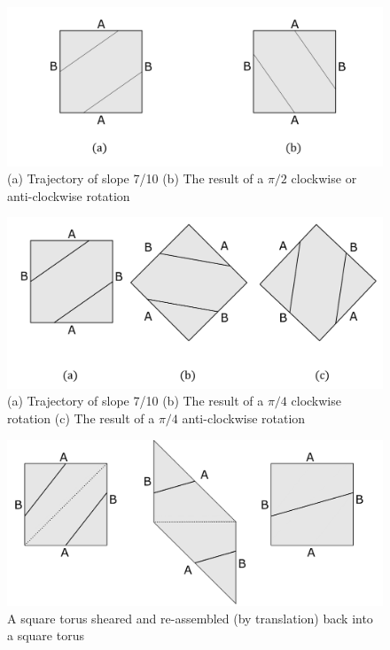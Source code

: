 \documentclass{report}
\begin{document}
\begin{figure} 
\begin{center}
\includegraphics[scale=0.3]{2.6}
\caption{(a) Trajectory of slope 7/10 (b) The result of a $\pi/2$ clockwise or anti-clockwise rotation}
\end{center}
\end{figure}

\begin{figure} 
\begin{center}
\includegraphics[scale=0.3]{2.7}
\caption{(a) Trajectory of slope 7/10 (b) The result of a $\pi/4$ clockwise rotation (c) The result of a $\pi/4$ anti-clockwise rotation}
\end{center}
\end{figure}


\begin{figure} 
\begin{center}
\includegraphics[scale=0.3]{2.8}
\caption{A square torus sheared and re-assembled (by translation) back into a square torus}
\end{center}
\end{figure}
\end{document}
